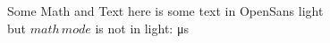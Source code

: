 \documentclass{beamer}
\begin{document}
    \begin{frame}{Some Math and Text}
        here is some text in OpenSans light \\
        but $math\,mode$ is not in light: \si{\micro\second}
    \end{frame}
\end{document}
